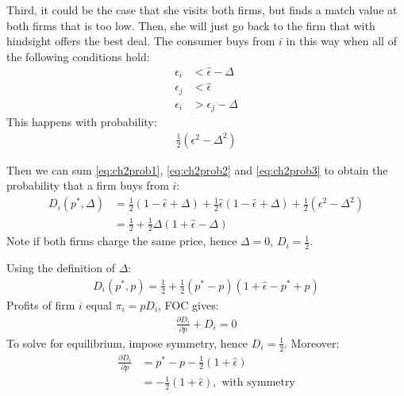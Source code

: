 \documentclass[a4paper,11pt]{article}
\numberwithin{equation}{section}
\newcommand{\1}[1]{\,\mathbb{1}_{#1}} %
\begin{document}
Third, it could be the case that she visits both firms, but finds a match value at both
firms that is too low. Then, she will just go back to the firm that with hindsight offers
the best deal. The consumer buys from $i$ in this way when all of the
following conditions hold:
\begin{align}
	\epsilon_i & <\hat\epsilon-\Delta \\
	\epsilon_j & <\hat\epsilon        \\
	\epsilon_i & >\epsilon_j-\Delta
\end{align}
This happens with probability:
\begin{align}
	\frac{1}{2}(\epsilon^2-\Delta^2)
	\label{eq:ch2prob3}
\end{align}

Then we can sum \ref{eq:ch2prob1}, \ref{eq:ch2prob2} and
\ref{eq:ch2prob3} to obtain the probability that a firm buys from $i$:
\begin{align}
	D_i(p^*,\Delta) & =
	\frac{1}{2}(1-\hat\epsilon+\Delta)+
	\frac{1}{2}\hat\epsilon(1-\hat\epsilon+\Delta)+
	\frac{1}{2}(\epsilon^2-\Delta^2)                                         \\
	                & = \frac{1}{2}+\frac{1}{2}\Delta(1+\hat\epsilon-\Delta)
\end{align}
Note if both firms charge the same price, hence $\Delta=0$,
$D_i=\frac{1}{2}$.

Using the definition of $\Delta$:
\begin{align}
	D_i(p^*,p)=\frac{1}{2}+\frac{1}{2}(p^*-p)(1+\hat\epsilon-p^*+p)
\end{align}
Profits of firm $i$ equal $\pi_i=pD_i$, FOC gives:
\begin{align}
	\frac{\partial D_i}{\partial p}+D_i=0
\end{align}
To solve for equilibrium, impose symmetry, hence $D_i=\frac{1}{2}$.
Moreover:
\begin{align}
	\frac{\partial D_i}{\partial p} & =p^*-p-\frac{1}{2}(1+\hat\epsilon)                  \\
	                                & =-\frac{1}{2}(1+\hat\epsilon),\text{ with symmetry}
\end{align}
\end{document}
